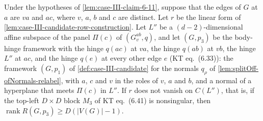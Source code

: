 \begin{lemma}
  \label{lem:case-III-claim612-p3-placement}
  \leanok
  Under the hypotheses of \cref{lem:case-III-claim-6-11}, suppose that
  the edges of $G$ at $a$ are $va$ and $ac$, where $v$, $a$, $b$ and $c$
  are distinct. Let $r$ be the linear form of
  \cref{lem:case-III-candidate-row-construction}. Let $L''$ be a
  $(d-2)$-dimensional affine subspace of the panel $\Pi(c)$ of
  $(G_v^{ab}, q)$, and let $(G, p_3)$ be the body-hinge framework with
  the hinge $q(ac)$ at $va$, the hinge $q(ab)$ at $vb$, the hinge $L''$
  at $ac$, and the hinge $q(e)$ at every other edge $e$ (KT
  eq.~(6.33)): the framework $(G, p_1)$ of \cref{def:case-III-candidate}
  for the normals $q_\rho$ of \cref{lem:splitOff-ofNormals-relabel}, with
  $a$, $c$ and $v$ in the roles of $v$, $a$ and $b$, and a normal of a
  hyperplane that meets $\Pi(c)$ in $L''$. If $r$ does not vanish on
  $C(L'')$, that is, if the top-left $D \times D$ block $M_3$ of KT
  eq.~(6.41) is nonsingular, then
  $\operatorname{rank} R(G, p_3) \ge D(|V(G)| - 1)$.
\end{lemma}

